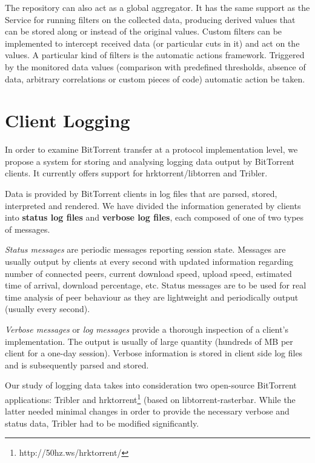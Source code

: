 The repository can also act as a global aggregator. It has the same support as
the Service for running filters on the collected data, producing derived
values that can be stored along or instead of the original values. Custom
filters can be implemented to intercept received data (or particular cuts in
it) and act on the values. A particular kind of filters is the automatic
actions framework. Triggered by the monitored data values (comparison with
predefined thresholds, absence of data, arbitrary correlations or custom
pieces of code) automatic action be taken.

\section{Client Logging}
\label{sec:results-logging}

In order to examine BitTorrent transfer at a protocol implementation level, we
propose a system for storing and analysing logging data output by BitTorrent
clients. It currently offers support for
hrktorrent/libtorren and Tribler.

Data is provided by BitTorrent clients in log files that are parsed, stored,
interpreted and rendered. We have divided the information generated by clients
into \textbf{status log files} and \textbf{verbose log files}, each composed
of one of two types of messages.

\textit{Status messages} are periodic messages reporting session state.
Messages are usually output by clients at every second with updated
information regarding number of connected peers, current download speed,
upload speed, estimated time of arrival, download percentage, etc. Status
messages are to be used for real time analysis of peer behaviour as they are
lightweight and periodically output (usually every second).

\textit{Verbose messages} or \textit{log messages} provide a thorough
inspection of a client's implementation. The output is usually of large
quantity (hundreds of MB per client for a one-day session). Verbose
information is stored in client side log files and is subsequently parsed and
stored.

Our study of logging data takes into consideration two open-source BitTorrent
applications: Tribler and hrktorrent\footnote{http://50hz.ws/hrktorrent/}
(based on libtorrent-rasterbar. While the latter needed minimal changes in
order to provide the necessary verbose and status data, Tribler had to be
modified significantly.

